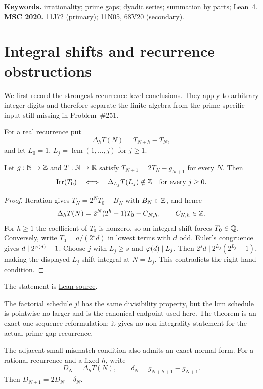 \documentclass[11pt]{article}
\begin{document}
\medskip
\noindent\textbf{Keywords.} irrationality; prime gaps; dyadic series;
summation by parts; Lean~4.
\qquad\textbf{MSC 2020.} 11J72 (primary); 11N05, 68V20 (secondary).

\section{Integral shifts and recurrence obstructions}\label{sec:diagonal-collapse}

We first record the strongest recurrence-level conclusions.  They apply to
arbitrary integer digits and therefore separate the finite algebra from the
prime-specific input still missing in Problem~\#251.

For a real recurrence put
\[
 \Delta_hT(N)=T_{N+h}-T_N,
\]
and let $L_0=1$, $L_j=\operatorname{lcm}(1,\ldots,j)$ for $j\ge1$.

\begin{theorem}\label{res:lcmdiagonal}
Let $g:\mathbb{N}\to\mathbb{Z}$ and $T:\mathbb{N}\to\mathbb{R}$ satisfy
$T_{N+1}=2T_N-g_{N+1}$ for every $N$.  Then
\[
 \operatorname{Irr}(T_0)
 \quad\Longleftrightarrow\quad
 \Delta_{L_j}T(L_j)\notin\mathbb{Z}
 \quad\hbox{for every }j\ge0.
\]
\end{theorem}

\begin{proof}
Iteration gives $T_N=2^NT_0-B_N$ with $B_N\in\mathbb{Z}$, and hence
\[
 \Delta_hT(N)=2^N(2^h-1)T_0-C_{N,h},\qquad C_{N,h}\in\mathbb{Z}.
\]
For $h\ge1$ the coefficient of $T_0$ is nonzero, so an integral shift
forces $T_0\in\mathbb{Q}$.  Conversely, write
$T_0=a/(2^sd)$ in lowest terms with $d$ odd.  Euler's congruence gives
$d\mid2^{\varphi(d)}-1$.  Choose $j$ with $L_j\ge s$ and $\varphi(d)\mid L_j$.
Then $2^s d\mid2^{L_j}(2^{L_j}-1)$, making the displayed $L_j$-shift
integral at $N=L_j$.  This contradicts the right-hand condition.
\end{proof}

\noindent The statement is \href{https://github.com/wcook04/plectis-erdos/blob/f36a98bf3d3e6f65f1074e3b800e3293d5b8a51a/ErdosProblems/Erdos251/OrderLatticeDiagonal.lean#L153}{Lean source}.

The factorial schedule $j!$ has the same divisibility property, but the lcm
schedule is pointwise no larger and is the canonical endpoint used here.  The
theorem is an exact one-sequence reformulation; it gives no non-integrality
statement for the actual prime-gap recurrence.

The adjacent-small-mismatch condition also admits an exact normal form.  For a
rational recurrence and a fixed $h$, write
\[
 D_N=\Delta_hT(N),\qquad
 \delta_N=g_{N+h+1}-g_{N+1}.
\]
Then $D_{N+1}=2D_N-\delta_N$.
\end{document}
